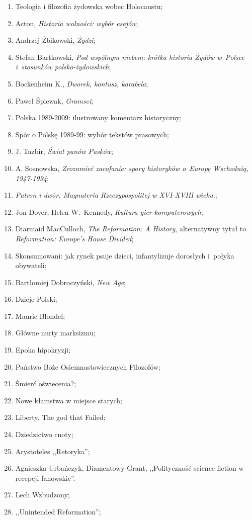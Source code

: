 \documentclass[a4paper,11pt]{article}
\begin{document}
\begin{enumerate}
\item Teologia i filozofia żydowska wobec Holocaustu;
\item Acton, \emph{Historia wolności: wybór esejów};
\item Andrzej Żbikowski, \emph{Żydzi};
\item Stefan Bartkowski, \emph{Pod wspólnym niebem: krótka historia
    Żydów w~Polsce i~stosunków polsko-żydowskich};
\item Bockenheim K., \emph{Dworek, kontusz, karabela};
\item Paweł Śpiewak, \emph{Gramsci};
\item Polska 1989-2009: ilustrowany komentarz historyczny;
\item Spór o Polskę 1989-99: wybór tekstów prasowych;
\item J. Tazbir, \emph{Świat panów Pasków};
\item A. Sosnowska, \emph{Zrozumieć zacofanie: spory historyków
    o~Europę Wschodnią, 1947-1994};
\item \emph{Patron i dwór. Magnateria Rzeczypospolitej w XVI-XVIII
    wieku.};
\item Jon Dover, Helen W.~Kennedy, \emph{Kultura gier komputerowych};
\item Diarmaid MacCulloch, \emph{The Reformation: A History},
  alternatywny tytuł to \emph{Reformation: Europe's House Divided};
\item Skonsumowani: jak rynek psuje dzieci, infantylizuje dorosłych
  i~połyka obywateli;
\item Bartłomiej Dobroczyński, \emph{New Age};
\item Dzieje Polski;
\item Mauric Blondel;
\item Główne nurty marksizmu;
\item Epoka hipokryzji;
\item Państwo Boże Osiemnastowiecznych Filozofów;
\item Śmierć oświecenia?;
\item Nowe kłamstwa w miejsce starych;
\item Liberty. The god that Failed;
\item Dziedzictwo cnoty;
\item Arystoteles ,,Retoryka'';
\item Agnieszka Urbańczyk, Diamentowy Grant, ,,Polityczność science
  fiction w recepcji fanowskie''.
\item Lech Wzbudzony;
\item ,,Unintended Reformation'';

\end{enumerate}
\end{document}
